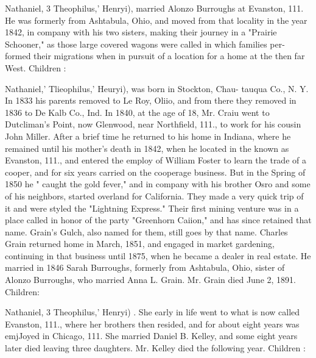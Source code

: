 \documentclass{book}
\begin{document}
Nathaniel, 3 Theophilus,' Henryi), married Alonzo Burroughs at 
Evanston, 111. He was formerly from Ashtabula, Ohio, and 
moved from that locality in the year 1842, in company with his 
two sisters, making their journey in a "Prairie Schooner," as 
those large covered wagons were called in which families per- 
formed their migrations when in pursuit of a location for a home 
at the then far West. Children : 










Nathaniel,' Tlieophilus,' Heuryi), was born in Stockton, Chau- 
tauqua Co., N. Y. In 1833 his parents removed to Le Roy, Oliio, 
and from there they removed in 1836 to De Kalb Co., Ind. In 
1840, at the age of 18, Mr. Craiu went to Dutcliman's Point, now 
Glenwood, near Northfield, 111., to work for his cousin John Miller. 
After a brief time he returned to his home in Indiana, where he 
remained until his mother's death in 1842, when he located in the 
known as Evanston, 111., and entered the employ of William 
Foster to learn the trade of a cooper, and for six years carried 
on the cooperage business. But in the Spring of 1850 he " caught 
the gold fever," and in company with his brother Osro and some 
of his neighbors, started overland for California. They made a 
very quick trip of it and were styled the "Lightning Express." 
Their first mining venture was in a place called in honor of the 
party "Greenhorn Caiion," and has since retained that name. 
Grain's Gulch, also named for them, still goes by that name. 
Charles Grain returned home in March, 1851, and engaged in 
market gardening, continuing in that business until 1875, when 
he became a dealer in real estate. He married in 1846 Sarah 
Burroughs, formerly from Ashtabula, Ohio, sister of Alonzo 
Burroughs, who married Anna L. Grain. Mr. Grain died June 
2, 1891. Children: 












Nathaniel, 3 Theophilus,' Henryi) . She early in life went to what 
is now called Evanston, 111., where her brothers then resided, and 
for about eight years was emjJoyed in Chicago, 111. She married 
Daniel B. Kelley, and some eight years later died leaving three 
daughters. Mr. Kelley died the following year. Children : 
\end{document}
